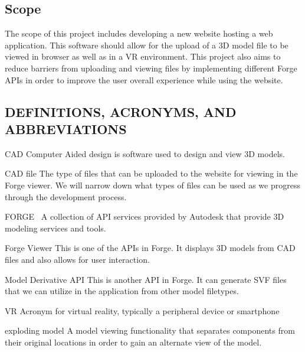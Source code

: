 \documentclass[letterpaper, 10pt, draftclsnofoot, compsoc, onecolumn]{IEEEtran}
\begin{document}
\subsection{Scope}
	The scope of this project includes developing a new website hosting a web application.
 	This software should allow for the upload of a 3D model file to be viewed in browser as well as in a VR environment. 
	This project also aims to reduce barriers from uploading and viewing files by implementing different Forge APIs in order to improve the user 
	overall experience while using the website.

\subsection{DEFINITIONS, ACRONYMS, AND ABBREVIATIONS}
	\begin{description}
	\item{CAD} Computer Aided design is software used to design and view 3D models.

	\item{CAD file} The type of files that can be uploaded to the website for viewing in the Forge viewer. 
	We will  narrow down what types of files can be used as we progress through the development process.

	\item{FORGE}~\cite{forge2016} A collection of API services provided by Autodesk that provide 3D modeling services and tools.

	\item{Forge Viewer} This is one of the APIs in Forge. It displays 3D models from CAD files and also allows
	for user interaction.
	
	\item{Model Derivative API} This is another API in Forge. It can generate SVF files that we can utilize in the application from other model filetypes.
	
	\item{VR} Acronym for virtual reality, typically a peripheral device or smartphone
	\item{exploding model} A model viewing functionality that separates components from their original locations in order to gain an alternate view of the model.
	\end{description} 

\clearpage
	


\end{document}
